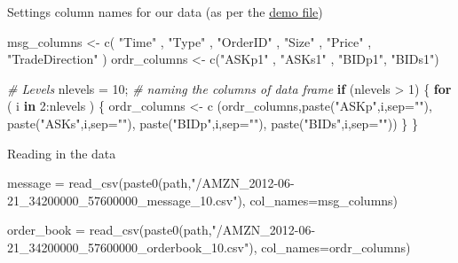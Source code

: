 \documentclass[
  oneside]{book}
\newenvironment{Shaded}{\begin{snugshade}}{\end{snugshade}}
\newcommand{\AttributeTok}[1]{\textcolor[rgb]{0.77,0.63,0.00}{#1}}
\newcommand{\CommentTok}[1]{\textcolor[rgb]{0.56,0.35,0.01}{\textit{#1}}}
\newcommand{\ControlFlowTok}[1]{\textcolor[rgb]{0.13,0.29,0.53}{\textbf{#1}}}
\newcommand{\DecValTok}[1]{\textcolor[rgb]{0.00,0.00,0.81}{#1}}
\newcommand{\FunctionTok}[1]{\textcolor[rgb]{0.00,0.00,0.00}{#1}}
\newcommand{\NormalTok}[1]{#1}
\newcommand{\OtherTok}[1]{\textcolor[rgb]{0.56,0.35,0.01}{#1}}
\newcommand{\SpecialCharTok}[1]{\textcolor[rgb]{0.00,0.00,0.00}{#1}}
\newcommand{\StringTok}[1]{\textcolor[rgb]{0.31,0.60,0.02}{#1}}
\begin{document}
Settings column names for our data (as per the \href{https://lobsterdata.com/info/help_codeHelp.php}{demo file})

\begin{Shaded}
\begin{Highlighting}[]
\NormalTok{msg\_columns }\OtherTok{\textless{}{-}} \FunctionTok{c}\NormalTok{( }\StringTok{"Time"}\NormalTok{ , }\StringTok{"Type"}\NormalTok{ , }\StringTok{"OrderID"}\NormalTok{ ,}
                  \StringTok{"Size"}\NormalTok{ , }\StringTok{"Price"}\NormalTok{ , }\StringTok{"TradeDirection"}\NormalTok{ )}
\NormalTok{ordr\_columns }\OtherTok{\textless{}{-}} \FunctionTok{c}\NormalTok{(}\StringTok{"ASKp1"}\NormalTok{ , }\StringTok{"ASKs1"}\NormalTok{ , }\StringTok{"BIDp1"}\NormalTok{,  }\StringTok{"BIDs1"}\NormalTok{)}

\CommentTok{\# Levels}
\NormalTok{nlevels }\OtherTok{=} \DecValTok{10}\NormalTok{;}
\CommentTok{\# naming the columns of data frame                                          }
\ControlFlowTok{if}\NormalTok{ (nlevels }\SpecialCharTok{\textgreater{}} \DecValTok{1}\NormalTok{)}
\NormalTok{\{}
    \ControlFlowTok{for}\NormalTok{ ( i }\ControlFlowTok{in} \DecValTok{2}\SpecialCharTok{:}\NormalTok{nlevels )}
\NormalTok{    \{ }
\NormalTok{        ordr\_columns }\OtherTok{\textless{}{-}} \FunctionTok{c}\NormalTok{ (ordr\_columns,}\FunctionTok{paste}\NormalTok{(}\StringTok{"ASKp"}\NormalTok{,i,}\AttributeTok{sep=}\StringTok{""}\NormalTok{),}
                           \FunctionTok{paste}\NormalTok{(}\StringTok{"ASKs"}\NormalTok{,i,}\AttributeTok{sep=}\StringTok{""}\NormalTok{),}
                           \FunctionTok{paste}\NormalTok{(}\StringTok{"BIDp"}\NormalTok{,i,}\AttributeTok{sep=}\StringTok{""}\NormalTok{),}
                           \FunctionTok{paste}\NormalTok{(}\StringTok{"BIDs"}\NormalTok{,i,}\AttributeTok{sep=}\StringTok{""}\NormalTok{)) }
\NormalTok{    \}}
\NormalTok{\}}
\end{Highlighting}
\end{Shaded}

Reading in the data

\begin{Shaded}
\begin{Highlighting}[]
\NormalTok{message }\OtherTok{=} \FunctionTok{read\_csv}\NormalTok{(}\FunctionTok{paste0}\NormalTok{(path,}\StringTok{"/AMZN\_2012{-}06{-}21\_34200000\_57600000\_message\_10.csv"}\NormalTok{),}
                   \AttributeTok{col\_names=}\NormalTok{msg\_columns)}

\NormalTok{order\_book }\OtherTok{=} \FunctionTok{read\_csv}\NormalTok{(}\FunctionTok{paste0}\NormalTok{(path,}\StringTok{"/AMZN\_2012{-}06{-}21\_34200000\_57600000\_orderbook\_10.csv"}\NormalTok{),}
                      \AttributeTok{col\_names=}\NormalTok{ordr\_columns)}
\end{Highlighting}
\end{Shaded}
\end{document}
